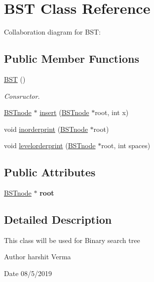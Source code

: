 \hypertarget{classBST}{}\section{B\+ST Class Reference}
\label{classBST}


Collaboration diagram for B\+ST\+:
\subsection*{Public Member Functions}
\begin{DoxyCompactItemize}
\item 
\mbox{\label{classBST_abc17123a0367c3b8ad0382eeb3ad3178}} 
\hyperlink{classBST_abc17123a0367c3b8ad0382eeb3ad3178}{B\+ST} ()
\begin{DoxyCompactList}\small\item\em Consructor. \end{DoxyCompactList}\item 
\hyperlink{classBSTnode}{B\+S\+Tnode} $\ast$ \hyperlink{classBST_af65e88788cd21ab5e64e645cbe541c8c}{insert} (\hyperlink{classBSTnode}{B\+S\+Tnode} $\ast$root, int x)
\item 
void \hyperlink{classBST_ada5620d8d4fd050273055ecea1d6f03b}{inorderprint} (\hyperlink{classBSTnode}{B\+S\+Tnode} $\ast$root)
\item 
void \hyperlink{classBST_a416d136d85763c420f35f5f3dcdb72db}{levelorderprint} (\hyperlink{classBSTnode}{B\+S\+Tnode} $\ast$root, int spaces)
\end{DoxyCompactItemize}
\subsection*{Public Attributes}
\begin{DoxyCompactItemize}
\item 
\mbox{\label{classBST_ad6a0adce52bff0415be37ce02070cfdc}} 
\hyperlink{classBSTnode}{B\+S\+Tnode} $\ast$ {\bfseries root}
\end{DoxyCompactItemize}


\subsection{Detailed Description}
This class will be used for Binary search tree \begin{DoxyAuthor}{Author}
harshit Verma 
\end{DoxyAuthor}
\begin{DoxyDate}{Date}
08/5/2019 
\end{DoxyDate}


